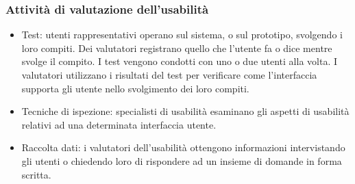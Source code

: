 \documentclass{article}
\begin{document}
\subsubsection{Attività di valutazione dell'usabilità}
\begin{itemize}
	\item Test: utenti rappresentativi operano sul sistema, o sul prototipo, svolgendo i loro compiti. Dei valutatori registrano quello che l'utente fa o dice mentre svolge il compito. I test vengono condotti con uno o due utenti alla volta. I valutatori utilizzano i risultati del test per verificare come l'interfaccia supporta gli utente nello svolgimento dei loro compiti.
	\item Tecniche di ispezione: specialisti di usabilità esaminano gli aspetti di usabilità relativi ad una determinata interfaccia utente.
	\item Raccolta dati: i valutatori dell'usabilità ottengono informazioni intervistando gli utenti o chiedendo loro di rispondere ad un insieme di domande in forma scritta.
\end{itemize}
\end{document}
